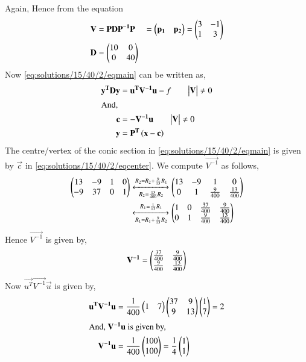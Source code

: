 Again, 
Hence from the equation
\begin{align}
\mathbf{V}&=\mathbf{P}\mathbf{D}\mathbf{P^{-1}}
\mathbf{P}&=\begin{pmatrix}\mathbf{p_1}&\mathbf{p_2}\end{pmatrix}=\begin{pmatrix}3&-1\\1&3\end{pmatrix}\\
\mathbf{D}&=\begin{pmatrix}10&0\\0&40\end{pmatrix}
\end{align}
Now \eqref{eq:solutions/15/40/2/eqmain} can be written as,
\begin{align}
\mathbf{y^T}\mathbf{D}\mathbf{y}&=\mathbf{u^T}\mathbf{V^{-1}}\mathbf{u}-f\qquad\text{$\begin{vmatrix}\mathbf{V}\end{vmatrix}\not=0$}\label{eq:solutions/15/40/2/eqnewmain}\\
\intertext{And,}
\mathbf{c}&= -\mathbf{V^{-1}}\mathbf{u}\qquad\text{$\begin{vmatrix}\mathbf{V}\end{vmatrix}\not=0$}\label{eq:solutions/15/40/2/eqcenter}\\
\mathbf{y} &= \mathbf{P^T}\left(\mathbf{x-c}\right)\label{eq:solutions/15/40/2/eqY}
\end{align}
The centre/vertex of the conic section in \eqref{eq:solutions/15/40/2/eqmain} is given by $\vec{c}$ in \eqref{eq:solutions/15/40/2/eqcenter}. 
We compute $\vec{V^{-1}}$ as follows,
\begin{align}
\begin{pmatrix}13&-9&1&0\\-9&37&0&1\end{pmatrix}&\xleftrightarrow[R_2=\frac{13}{400}R_2]{R_2=R_2+\frac{9}{13}R_1}\begin{pmatrix}13&-9&1&0\\0&1&\frac{9}{400}&\frac{13}{400}\end{pmatrix}\\
&\xleftrightarrow[R_1=R_1+\frac{9}{13}R_2]{R_1=\frac{1}{13}R_1}\begin{pmatrix}1&0&\frac{37}{400}&\frac{9}{400}\\0&1&\frac{9}{400}&\frac{13}{400}\end{pmatrix}
\end{align}
Hence $\vec{V^{-1}}$ is given by,
\begin{align}
\mathbf{V^{-1}} = \begin{pmatrix}\frac{37}{400}&\frac{9}{400}\\\frac{9}{400}&\frac{13}{400}\end{pmatrix}
\end{align}
Now $\vec{u^T}\vec{V^{-1}}\vec{u}$ is given by,
\begin{align}
\mathbf{u^T}\mathbf{V^{-1}}\mathbf{u}&=\frac{1}{400}\begin{pmatrix}1&7\end{pmatrix}\begin{pmatrix}37&9\\9&13\end{pmatrix}\begin{pmatrix}1\\7\end{pmatrix}=2\label{eq:solutions/15/40/2/eqRHS}\\
\intertext{And, $\mathbf{V^{-1}}\mathbf{u}$ is given by,}
\mathbf{V^{-1}}\mathbf{u} &= \frac{1}{400}\begin{pmatrix}100\\100\end{pmatrix}=\frac{1}{4}\begin{pmatrix}1\\1\end{pmatrix}\label{eq:solutions/15/40/2/eqcenterRHS}
\end{align}
